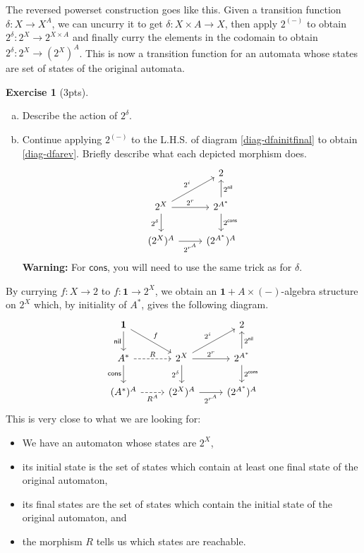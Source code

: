 \documentclass{article}
\theoremstyle{definition}
\newtheorem{exer}{Exercise}
\theoremstyle{remark}
\begin{document}
The reversed powerset construction goes like this. Given a transition function $\delta: X \rightarrow X^A$, we can uncurry it to get $\delta : X\times A \rightarrow X$, then apply $2^{(-)}$ to obtain $2^{\delta}: 2^X \rightarrow 2^{X\times A}$ and finally curry the elements in the codomain to obtain $2^{\delta}: 2^X \rightarrow (2^X)^A$. This is now a transition function for an automata whose states are set of states of the original automata.
\begin{exer}[3pts]
    \begin{enumerate}[(a)]
        \item Describe the action of $2^{\delta}$.
        \item Continue applying $2^{(-)}$ to the L.H.S. of diagram \eqref{diag-dfainitfinal} to obtain \eqref{diag-dfarev}. Briefly describe what each depicted morphism does.
        \begin{equation}\label{diag-dfarev}
            \begin{tikzcd}
            & 2 \\
            2^X \arrow[ru, "2^i"] \arrow[d, "2^{\delta}"'] \arrow[r, "2^r"] & 2^{A^*} \arrow[u, "2^{\textsf{nil}}"'] \arrow[d, "2^{\textsf{cons}}"] \\
            (2^X)^A \arrow[r, "2^{r^A}"'] & (2^{A^*})^A 
            \end{tikzcd}
        \end{equation}
        \textbf{Warning:} For $\textsf{cons}$, you will need to use the same trick as for $\delta$.
    \end{enumerate}
\end{exer}
By currying $f:X \rightarrow 2$ to $f: \mathbf{1} \rightarrow 2^X$, we obtain an $\mathbf{1}+ A\times(-)$-algebra structure on $2^X$ which, by initiality of $A^*$, gives the following diagram.
\begin{equation}\label{diag-dfarevall}
\begin{tikzcd}
\mathbf{1} \arrow[rd, "f"] \arrow[d, "\textsf{nil}"'] & & 2 \\
A^* \arrow[d, "\textsf{cons}"'] \arrow[r, "R", dashed] & 2^X \arrow[ru, "2^i"] \arrow[d, "2^{\delta}"'] \arrow[r, "2^r"] & 2^{A^*} \arrow[u, "2^{\textsf{nil}}"'] \arrow[d, "2^{\textsf{cons}}"] \\
(A^*)^A \arrow[r, "R^A"', dashed] & (2^X)^A \arrow[r, "2^{r^A}"'] & (2^{A^*})^A 
\end{tikzcd}
\end{equation}
This is very close to what we are looking for:
\begin{itemize}
    \item We have an automaton whose states are $2^X$,
    \item its initial state is the set of states which contain at least one final state of the original automaton,
    \item its final states are the set of states which contain the initial state of the original automaton, and
    \item the morphism $R$ tells us which states are reachable.
\end{itemize}
\end{document}
